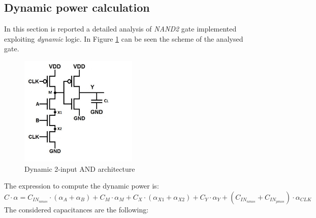 \documentclass[12pt,  english, makeidx, a4paper, titlepage, oneside]{article}
\begin{document}
\subsection{Dynamic power calculation} 
In this section is reported a detailed analysis of \textit{NAND2} gate implemented exploiting \textit{dynamic} logic. In Figure \ref{NAND2_DynamicLogic} can be seen the scheme of the analysed  gate.
\begin{figure}[htbp]
	\begin{center}
		\includegraphics[width=0.5\textwidth]{img/NAND2_DynLogic_PotDyn}
		\caption{Dynamic 2-input AND architecture}
		\label{NAND2_DynamicLogic}
	\end{center}
\end{figure}
The expression to compute the dynamic power is:
\begin{equation}
C \cdot \alpha = C_{IN_{nmos}} \cdot (\alpha_A + \alpha_B)+ C_M \cdot \alpha_M+C_X \cdot (\alpha_{X1}+\alpha_{X2})+ C_Y \cdot \alpha_Y+ (C_{IN_{nmos}}+C_{IN_{pmos}}) \cdot \alpha_{CLK}
\end{equation}
The considered capacitances are the following:
\end{document}
